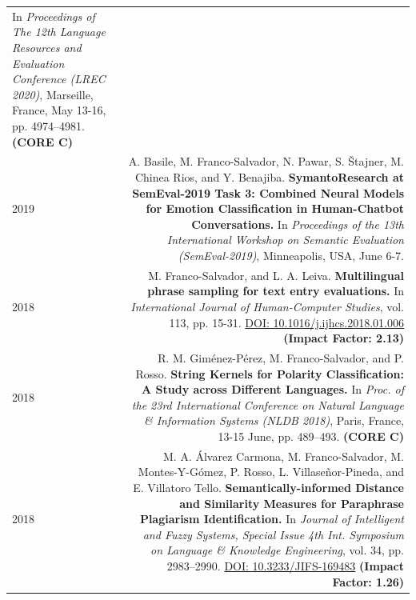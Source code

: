 \documentclass[10pt]{article}
\begin{document}
\begin{tabular}{L!{\VRule}R}
	In \emph{Proceedings of The 12th Language Resources and Evaluation Conference (LREC 2020)}, Marseille, France, May 13-16, pp. 4974--4981. 	\textbf{(CORE C)}\vspace{5pt}\\
	2019 & A. Basile, M. Franco-Salvador, N. Pawar, S. \v{S}tajner, M. Chinea Rios, and Y. Benajiba. \textbf{SymantoResearch at SemEval-2019 Task 3: Combined Neural Models for Emotion Classification in Human-Chatbot Conversations.}
	In \emph{Proceedings of the 13th International Workshop on Semantic Evaluation (SemEval-2019)}, Minneapolis, USA, June 6-7.\vspace{5pt}\\
	2018 & M. Franco-Salvador, and L. A. Leiva. \textbf{Multilingual phrase sampling for text entry evaluations.}
	In \emph{International Journal of Human-Computer Studies}, vol. 113, pp. 15-31. \href{https://doi.org/10.1016/j.ijhcs.2018.01.006}{DOI: 10.1016/j.ijhcs.2018.01.006} \textbf{(Impact Factor: 2.13)} \vspace{5pt}\\	
	2018& R. M. Gim{\'e}nez-P{\'e}rez, M. Franco-Salvador, and P. Rosso. \textbf{String Kernels for Polarity Classification: A Study across Different Languages.}
	In \emph{Proc. of the 23rd International Conference on Natural Language \& Information Systems (NLDB 2018)}, Paris, France, 13-15 June, pp. 489--493. \textbf{(CORE C)}\vspace{5pt}\\
	2018&M. A. {\'A}lvarez Carmona,  M. Franco-Salvador, M. Montes-Y-G{\'o}mez, P. Rosso, L. Villase{\~n}or-Pineda, and E. Villatoro Tello. \textbf{Semantically-informed Distance and Similarity Measures for Paraphrase Plagiarism Identification.}
	In \emph{Journal of Intelligent and Fuzzy Systems, Special Issue 4th Int. Symposium on Language \& Knowledge Engineering}, vol. 34, pp. 2983--2990. \href{https://doi.org/10.3233/JIFS-169483}{DOI: 10.3233/JIFS-169483} \textbf{(Impact Factor: 1.26)} \vspace{5pt}\\	
\end{tabular}
\end{document}
